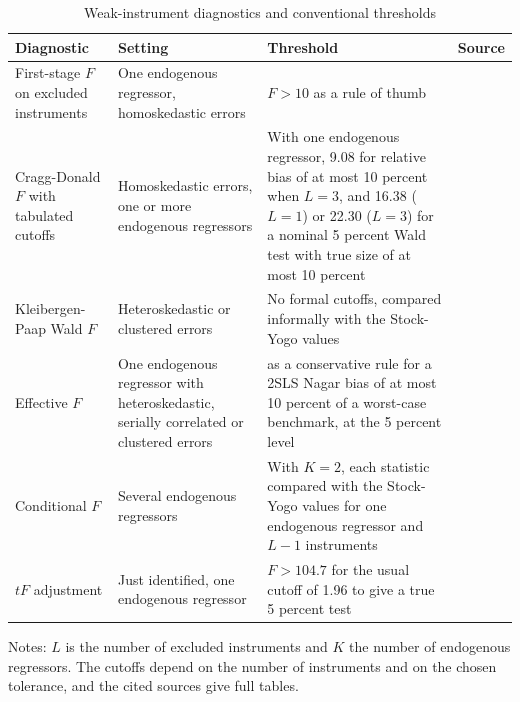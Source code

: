 \begin{table}[htbp]
\centering
\caption{Weak-instrument diagnostics and conventional thresholds}
\label{tab:A-weakiv}
\footnotesize
\begin{tabularx}{\textwidth}{@{}>{\raggedright\arraybackslash}p{}
>{\raggedright\arraybackslash}X >{\raggedright\arraybackslash}X >{\raggedright\arraybackslash}p{}@{}}
\toprule
Diagnostic & Setting & Threshold & Source \\
\midrule
First-stage $F$ on excluded instruments & One endogenous regressor, homoskedastic errors & $F > 10$ as a rule of
thumb & \citet{StaigerStock1997} \\
\addlinespace
Cragg-Donald $F$ with tabulated cutoffs & Homoskedastic errors, one or more endogenous regressors &
With one endogenous regressor, 9.08 for relative bias of at most 10 percent when $L = 3$, and 16.38
($L = 1$) or 22.30 ($L = 3$) for a nominal 5 percent Wald test with true size of at most 10 percent &
\citet[Tables~5.1--5.2]{StockYogo2005} \\
\addlinespace
Kleibergen-Paap Wald $F$ & Heteroskedastic or clustered errors & No formal cutoffs, compared informally with
the Stock-Yogo values & \citet{KleibergenPaap2006} \\
\addlinespace
Effective $F$ & One endogenous regressor with heteroskedastic, serially correlated or clustered errors & 23.1
as a conservative rule for a 2SLS Nagar bias of at most 10 percent of a worst-case benchmark, at the 5 percent
level & \citet[p.~358]{MontielOleaPflueger2013} \\
\addlinespace
Conditional $F$ & Several endogenous regressors & With $K = 2$, each statistic compared with the Stock-Yogo values
for one endogenous regressor and $L - 1$ instruments & \citet[Section~4]{SandersonWindmeijer2016} \\
\addlinespace
$tF$ adjustment & Just identified, one endogenous regressor & $F > 104.7$ for the usual cutoff of 1.96 to give a
true 5 percent test & \citet{LeeEtAl2022} \\
\bottomrule
\end{tabularx}

\smallskip
\begin{minipage}{0.92\textwidth}\footnotesize
Notes: $L$ is the number of excluded instruments and $K$ the number of endogenous regressors. The cutoffs
depend on the number of instruments and on the chosen tolerance, and the cited sources give full tables.
\end{minipage}
\end{table}

